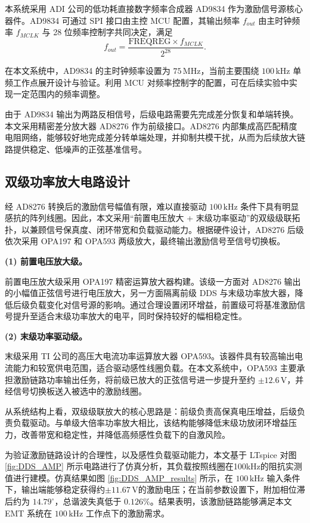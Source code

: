 本系统采用 ADI 公司的低功耗直接数字频率合成器 AD9834 作为激励信号源核心器件。AD9834 可通过 SPI 接口由主控 MCU 配置，其输出频率 $f_{out}$ 由主时钟频率 $f_{MCLK}$ 与 28 位频率控制字共同决定，满足
\begin{equation}
\label{eqn:DDS_freq}
f_{out}=\frac{\mathrm{FREQREG}\times f_{MCLK}}{2^{28}}.
\end{equation}

在本文系统中，AD9834 的主时钟频率设置为 $75\,\mathrm{MHz}$，当前主要围绕 $100\,\mathrm{kHz}$ 单频工作点展开设计与验证。利用 MCU 对频率控制字的配置，可在后续实验中实现一定范围内的频率调整。

由于 AD9834 输出为两路反相信号，后级电路需要先完成差分恢复和单端转换。本文采用精密差分放大器 AD8276 作为前级接口。AD8276 内部集成高匹配精度电阻网络，能够较好地完成差分转单端处理，并抑制共模干扰，从而为后续放大链路提供稳定、低噪声的正弦基准信号。

\subsection{双级功率放大电路设计}

经 AD8276 转换后的激励信号幅值有限，难以直接驱动 $100\,\mathrm{kHz}$ 条件下具有明显感抗的阵列线圈。因此，本文采用``前置电压放大 + 末级功率驱动''的双级级联拓扑，以兼顾信号保真度、闭环带宽和负载驱动能力。根据硬件设计，AD8276 后级依次采用 OPA197 和 OPA593 两级放大，最终输出激励信号至信号切换板。

\textbf{(1) 前置电压放大级。}

前置电压放大级采用 OPA197 精密运算放大器构建。该级一方面对 AD8276 输出的小幅值正弦信号进行电压放大，另一方面隔离前级 DDS 与末级功率放大器，降低后级负载变化对信号源的影响。通过合理设置闭环增益，前置级可将基准激励信号提升至适合末级功率放大的电平，同时保持较好的幅相稳定性。

\textbf{(2) 末级功率驱动级。}

末级采用 TI 公司的高压大电流功率运算放大器 OPA593。该器件具有较高输出电流能力和较宽供电范围，适合驱动感性线圈负载。在本文系统中，OPA593 主要承担激励链路功率输出任务，将前级已放大的正弦信号进一步提升至约 $\pm12.6\,\mathrm{V}$，并经信号切换板送入被选中的激励线圈。

从系统结构上看，双级级联放大的核心思路是：前级负责高保真电压增益，后级负责负载驱动。与单级大倍率功率放大相比，该结构能够降低末级功放闭环增益压力，改善带宽和稳定性，并降低高频感性负载下的自激风险。

为验证激励链路设计的合理性，以及感性负载驱动能力，本文基于 LTspice 对图 \ref{fig:DDS_AMP} 所示电路进行了仿真分析，其负载按照线圈在100kHz的阻抗实测值进行建模。仿真结果如图 \ref{fig:DDS_AMP_results} 所示，在 $100\,\mathrm{kHz}$ 输入条件下，输出端能够稳定获得约$\pm11.67\,\mathrm{V}$的激励电压；在当前参数设置下，附加相位滞后约为 $14.79^\circ$，总谐波失真低于 $0.126\%$。结果表明，该激励链路能够满足本文 EMT 系统在 $100\,\mathrm{kHz}$ 工作点下的激励需求。

